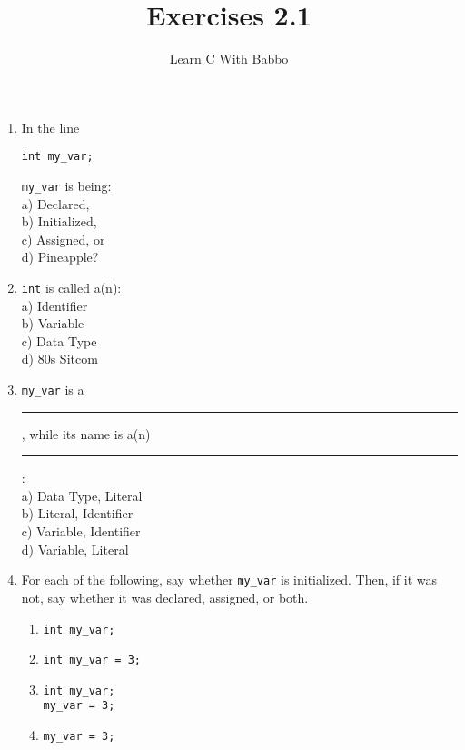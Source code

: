 \documentclass{article}
\begin{document}
\title{Exercises 2.1}
\author{Learn C With Babbo}
\date{}
\maketitle
\begin{enumerate}
\item
In the line
\begin{lstlisting}[style=CStyle]
int my_var;
\end{lstlisting}
\verb|my_var| is being: \\
a) Declared, \\
b) Initialized, \\
c) Assigned, or \\
d) Pineapple?
\item
\verb|int| is called a(n): \\
a) Identifier \\
b) Variable \\
c) Data Type \\
d) 80s Sitcom
\item \verb|my_var| is a \rule{1cm}{0.15mm}, while its name is a(n) \rule{1cm}{0.15mm}: \\
a) Data Type, Literal \\
b) Literal, Identifier \\
c) Variable, Identifier \\
d) Variable, Literal
\item For each of the following, say whether \verb|my_var| is initialized. Then, if it was not, say whether it was 
declared, assigned, or both.
\begin{enumerate}
\item 
\begin{lstlisting}[style=CStyle]
int my_var;
\end{lstlisting}


\item 
\begin{lstlisting}[style=CStyle]
int my_var = 3;
\end{lstlisting}


\item
\begin{lstlisting}[style=CStyle]
int my_var;
my_var = 3;
\end{lstlisting}


\item 
\begin{lstlisting}[style=CStyle]
my_var = 3;
\end{lstlisting}


\end{enumerate}
\end{enumerate}
\end{document}
